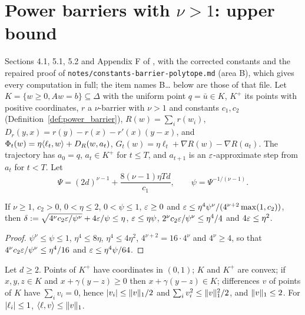 \chapter{Power barriers with \texorpdfstring{$\nu > 1$}{nu > 1}: upper bound}
\label{chap:barrier_upper}

Sections 4.1, 5.1, 5.2 and Appendix F of \cite{SSKM26}, with the corrected constants and the
repaired proof of \texttt{notes/constants-barrier-polytope.md} (area B), which gives every
computation in full; the item names B\ldots{} below are those of that file. Let $K = \{w \ge 0,
Aw = b\} \subseteq \Delta$ with the uniform point $q = \bar u \in K$, $K^+$ its points with positive
coordinates, $r$ a $\nu$-barrier with $\nu > 1$ and constants $c_1, c_2$ (Definition~\ref{def:power_barrier}),
$R(w) = \sum_i r(w_i)$, $D_r(y, x) = r(y) - r(x) - r'(x)(y - x)$, and $\Phi_t(w) = \eta\langle \ell_t, w \rangle +
D_R(w, a_t)$, $G_t(w) = \eta\ell_t + \nabla R(w) - \nabla R(a_t)$. The trajectory has $a_0 = q$,
$a_t \in K^+$ for $t \le T$, and $a_{t+1}$ is an $\varepsilon$-approximate step from $a_t$ for $t < T$. Let
\[ \Psi = (2d)^{\nu - 1} + \frac{8(\nu - 1)\eta T d}{c_1}, \qquad \psi = \Psi^{-1/(\nu-1)}. \]

\begin{lemma}[B1]
  \label{lem:bar_constants}
  \leanok
  If $\nu \ge 1$, $c_2 > 0$, $0 < \eta \le 2$, $0 < \psi \le 1$, $\varepsilon \ge 0$ and
  $\varepsilon \le \eta^4\psi^\nu/(4^{\nu+2}\max(1, c_2))$, then
  $\delta := \sqrt{4^\nu c_2\varepsilon/\psi^\nu} + 4\varepsilon/\psi \le \eta$, $\varepsilon \le \eta\psi$,
  $2^\nu c_2\varepsilon/\psi^\nu \le \eta^4/4$ and $4\varepsilon \le \eta^2$.
\end{lemma}

\begin{proof}
  \leanok
  $\psi^\nu \le \psi \le 1$, $\eta^4 \le 8\eta$, $\eta^4 \le 4\eta^2$, $4^{\nu+2} = 16 \cdot 4^\nu$ and
  $4^\nu \ge 4$, so that $4^\nu c_2\varepsilon/\psi^\nu \le \eta^4/16$ and $\varepsilon \le \eta^4\psi/64$.
\end{proof}

\begin{lemma}
  \label{lem:polytope_facts}
  \leanok
  Let $d \ge 2$. Points of $K^+$ have coordinates in $(0, 1)$; $K$ and $K^+$ are convex; if
  $x, y, z \in K$ and $x + \gamma(y - z) \ge 0$ then $x + \gamma(y - z) \in K$; differences $v$ of
  points of $K$ have $\sum_i v_i = 0$, hence $\lvert v_i \rvert \le \lVert v \rVert_1/2$ and
  $\sum_i v_i^2 \le \lVert v \rVert_1^2/2$, and $\lVert v \rVert_1 \le 2$. For $\lvert \ell_i \rvert \le 1$,
  $\langle \ell, v \rangle \le \lVert v \rVert_1$.
\end{lemma}

